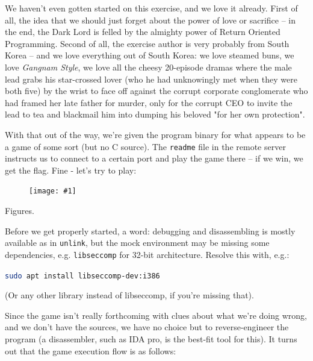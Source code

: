 \documentclass{article}
\newcommand{\displayimage}[1] {
\begin{figure}[H]
    \centering
    \texttt{[image: \#1]} 
\end{figure}
}
\newcommand{\xcode}[2]{\colorbox{ubuntuback}{\lstinline[language=#1]|#2|}}
\newcommand{\code}[1]{\colorbox{ubuntuback}{\texttt{#1}}}
\begin{document}
We haven't even gotten started on this exercise, and we love it already. First of all, the idea that we should just forget about the power of love or sacrifice -- in the end, the Dark Lord is felled by the almighty power of Return Oriented Programming. Second of all, the exercise author is very probably from South Korea -- and we love everything out of South Korea: we love steamed buns, we love \textit{Gangnam Style}, we love all the cheesy 20-episode dramas where the male lead grabs his star-crossed lover (who he had unknowingly met when they were both five) by the wrist to face off against the corrupt corporate conglomerate who had framed her late father for murder, only for the corrupt CEO to invite the lead to tea and blackmail him into dumping his beloved "for her own protection".

With that out of the way, we're given the program binary for what appears to be a game of some sort (but no C source). The \xcode{bash}{readme} file in the remote server instructs us to connect to a certain port and play the game there -- if we win, we get the flag. Fine - let's try to play:

\displayimage{../20_horcruxes/normal_play.png}

Figures. 

Before we get properly started, a word: debugging and disassembling is mostly available as in \code{unlink}, but the mock environment may be missing some dependencies, e.g. \code{libseccomp} for 32-bit architecture. Resolve this with, e.g.:

\xcode{bash}{sudo apt install libseccomp-dev:i386}

(Or any other library instead of libseccomp, if you're missing that).

Since the game isn't really forthcoming with clues about what we're doing wrong, and we don't have the sources, we have no choice but to reverse-engineer the program (a disassembler, such as IDA pro, is the best-fit tool for this). It turns out that the game execution flow is as follows:
\end{document}

